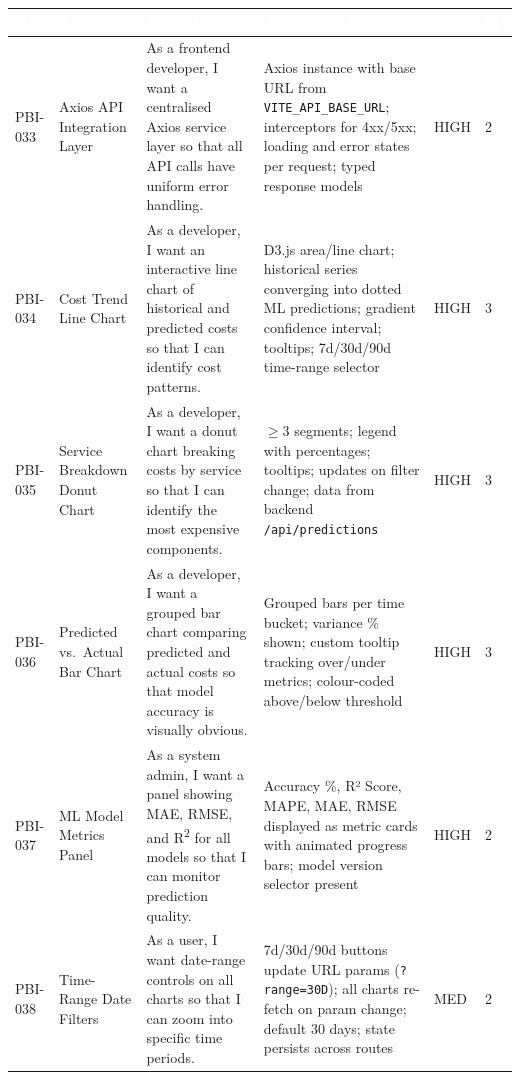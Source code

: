 \documentclass[10pt,a4paper]{article}
\begin{document}
\renewcommand{\arraystretch}{1.45}
\begin{tabularx}{\textwidth}{|L{1.4cm}|L{3.2cm}|X|L{3cm}|L{1cm}|L{0.6cm}|}
\hline
{}
\textcolor{white}{\textbf{ID}} &
\textcolor{white}{\textbf{Title}} &
\textcolor{white}{\textbf{User Story}} &
\textcolor{white}{\textbf{Acceptance Criteria}} &
\textcolor{white}{\textbf{Pri.}} &
\textcolor{white}{\textbf{SP}} \\ \hline

PBI-033 &
Axios API Integration Layer &
As a frontend developer, I want a centralised Axios service layer so that all API calls have uniform error handling. &
Axios instance with base URL from \texttt{VITE\_API\_BASE\_URL}; interceptors for 4xx/5xx; loading and error states per request; typed response models &
HIGH & 2 \\ \hline

PBI-034 &
Cost Trend Line Chart &
As a developer, I want an interactive line chart of historical and predicted costs so that I can identify cost patterns. &
D3.js area/line chart; historical series converging into dotted ML predictions; gradient confidence interval; tooltips; 7d/30d/90d time-range selector &
HIGH & 3 \\ \hline

PBI-035 &
Service Breakdown Donut Chart &
As a developer, I want a donut chart breaking costs by service so that I can identify the most expensive components. &
$\geq$3 segments; legend with percentages; tooltips; updates on filter change; data from backend \texttt{/api/predictions} &
HIGH & 3 \\ \hline

PBI-036 &
Predicted vs.\ Actual Bar Chart &
As a developer, I want a grouped bar chart comparing predicted and actual costs so that model accuracy is visually obvious. &
Grouped bars per time bucket; variance \% shown; custom tooltip tracking over/under metrics; colour-coded above/below threshold &
HIGH & 3 \\ \hline

PBI-037 &
ML Model Metrics Panel &
As a system admin, I want a panel showing MAE, RMSE, and R\textsuperscript{2} for all models so that I can monitor prediction quality. &
Accuracy \%, R² Score, MAPE, MAE, RMSE displayed as metric cards with animated progress bars; model version selector present &
HIGH & 2 \\ \hline

PBI-038 &
Time-Range Date Filters &
As a user, I want date-range controls on all charts so that I can zoom into specific time periods. &
7d/30d/90d buttons update URL params (\texttt{?range=30D}); all charts re-fetch on param change; default 30 days; state persists across routes &
MED & 2 \\ \hline


\end{tabularx}
\end{document}
